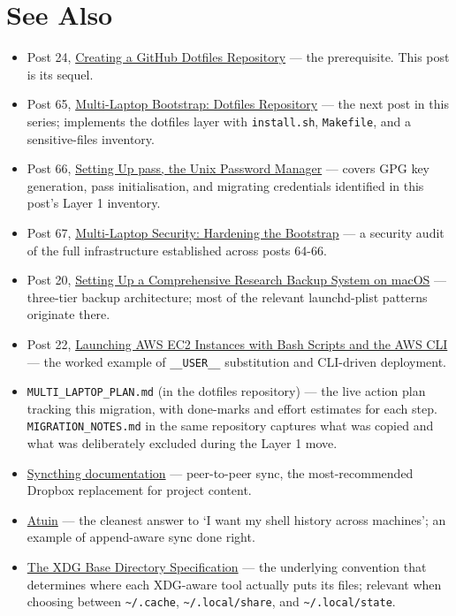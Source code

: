 \documentclass[
  11pt,
  letterpaper,
  DIV=11,
  numbers=noendperiod]{scrartcl}
\providecommand{\tightlist}{%
  \setlength{\itemsep}{0pt}\setlength{\parskip}{0pt}}\usepackage{longtable,booktabs,array}
\begin{document}
\section{See Also}\label{see-also}

\begin{itemize}
\tightlist
\item
  Post 24,
  \href{https://focusonr.org/posts/24-setupdotfilesongithub/}{Creating a
  GitHub Dotfiles Repository} --- the prerequisite. This post is its
  sequel.
\item
  Post 65,
  \href{https://focusonr.org/posts/65-multi-laptop-bootstrap/}{Multi-Laptop
  Bootstrap: Dotfiles Repository} --- the next post in this series;
  implements the dotfiles layer with \texttt{install.sh},
  \texttt{Makefile}, and a sensitive-files inventory.
\item
  Post 66, \href{https://focusonr.org/posts/66-unix-pass-setup/}{Setting
  Up pass, the Unix Password Manager} --- covers GPG key generation,
  pass initialisation, and migrating credentials identified in this
  post's Layer 1 inventory.
\item
  Post 67,
  \href{https://focusonr.org/posts/67-multi-laptop-security/}{Multi-Laptop
  Security: Hardening the Bootstrap} --- a security audit of the full
  infrastructure established across posts 64-66.
\item
  Post 20,
  \href{https://focusonr.org/posts/20-researchbackupsystem/}{Setting Up
  a Comprehensive Research Backup System on macOS} --- three-tier backup
  architecture; most of the relevant launchd-plist patterns originate
  there.
\item
  Post 22,
  \href{https://focusonr.org/posts/22-serversetupawscli/}{Launching AWS
  EC2 Instances with Bash Scripts and the AWS CLI} --- the worked
  example of \texttt{\_\_USER\_\_} substitution and CLI-driven
  deployment.
\item
  \texttt{MULTI\_LAPTOP\_PLAN.md} (in the dotfiles repository) --- the
  live action plan tracking this migration, with done-marks and effort
  estimates for each step. \texttt{MIGRATION\_NOTES.md} in the same
  repository captures what was copied and what was deliberately excluded
  during the Layer 1 move.
\item
  \href{https://docs.syncthing.net/}{Syncthing documentation} ---
  peer-to-peer sync, the most-recommended Dropbox replacement for
  project content.
\item
  \href{https://atuin.sh/}{Atuin} --- the cleanest answer to `I want my
  shell history across machines'; an example of append-aware sync done
  right.
\item
  \href{https://specifications.freedesktop.org/basedir-spec/basedir-spec-latest.html}{The
  XDG Base Directory Specification} --- the underlying convention that
  determines where each XDG-aware tool actually puts its files; relevant
  when choosing between \texttt{\textasciitilde{}/.cache},
  \texttt{\textasciitilde{}/.local/share}, and
  \texttt{\textasciitilde{}/.local/state}.
\end{itemize}
\end{document}
